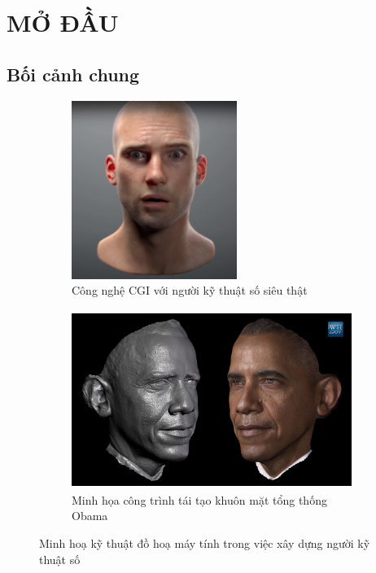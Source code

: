 
\chapter{MỞ ĐẦU}
\label{Introduction}

\section{Bối cảnh chung}


\begin{figure}[htbp]
	\centering
	\begin{subfigure}{0.35\textwidth}
		\centering
		\includegraphics[height=5.8cm]{images/cgi}
		 \caption{\small Công nghệ CGI với người kỹ thuật số siêu thật \cite{edchrisjones}}
		\label{fig:CGI}
	\end{subfigure}
	\hfill
	\begin{subfigure}{0.6\textwidth}
		\centering
		\includegraphics[height=5.8cm]{images/obama_scan}
		\caption{\small Minh họa công trình tái tạo khuôn mặt tổng thống Obama \cite{metallo2015scanning}}
		\label{fig:obamascan}
	\end{subfigure}
	\caption{Minh hoạ kỹ thuật đồ hoạ máy tính trong việc xây dựng người kỹ thuật số}
	\label{fig:DigitalHuman}
\end{figure}
%
%

